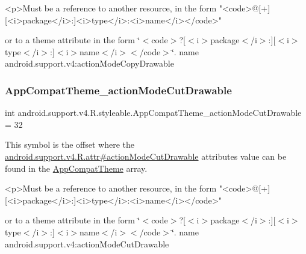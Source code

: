 \begin{DoxyVerb}      <p>Must be a reference to another resource, in the form "<code>@[+][<i>package</i>:]<i>type</i>:<i>name</i></code>"
\end{DoxyVerb}
 or to a theme attribute in the form \char`\"{}$<$code$>$?\mbox{[}$<$i$>$package$<$/i$>$\+:\mbox{]}\mbox{[}$<$i$>$type$<$/i$>$\+:\mbox{]}$<$i$>$name$<$/i$>$$<$/code$>$\char`\"{}.  name android.\+support.\+v4\+:action\+Mode\+Copy\+Drawable \mbox{\label{classandroid_1_1support_1_1v4_1_1R_1_1styleable_abe3095e21e91f61195e7e499bed38e0e}} 
\subsubsection{\texorpdfstring{App\+Compat\+Theme\+\_\+action\+Mode\+Cut\+Drawable}{AppCompatTheme\_actionModeCutDrawable}}
{\footnotesize\ttfamily int android.\+support.\+v4.\+R.\+styleable.\+App\+Compat\+Theme\+\_\+action\+Mode\+Cut\+Drawable = 32\hspace{0.3cm}{\ttfamily [static]}}

This symbol is the offset where the \hyperlink{classandroid_1_1support_1_1v4_1_1R_1_1attr_a153c359f53156ef6f6c8cbdae115e970}{android.\+support.\+v4.\+R.\+attr\#action\+Mode\+Cut\+Drawable} attribute\textquotesingle{}s value can be found in the \hyperlink{classandroid_1_1support_1_1v4_1_1R_1_1styleable_ac07ebbe62ed977f6dcaadc6397840ace}{App\+Compat\+Theme} array.

\begin{DoxyVerb}      <p>Must be a reference to another resource, in the form "<code>@[+][<i>package</i>:]<i>type</i>:<i>name</i></code>"
\end{DoxyVerb}
 or to a theme attribute in the form \char`\"{}$<$code$>$?\mbox{[}$<$i$>$package$<$/i$>$\+:\mbox{]}\mbox{[}$<$i$>$type$<$/i$>$\+:\mbox{]}$<$i$>$name$<$/i$>$$<$/code$>$\char`\"{}.  name android.\+support.\+v4\+:action\+Mode\+Cut\+Drawable \mbox{\label{classandroid_1_1support_1_1v4_1_1R_1_1styleable_aed5000c3e758ba19503acb4620d9059b}} 
